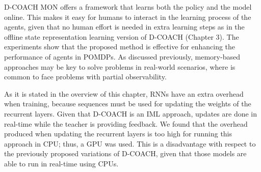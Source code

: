 D-COACH MON offers a framework that learns both the policy and the model online. This makes it easy for humans to interact in the learning process of the agents, given that no human effort is needed in extra learning steps as in the offline state representation learning version of D-COACH (Chapter 3). The experiments show that the proposed method is effective for enhancing the performance of agents in POMDPs. As discussed previously, memory-based approaches may be key to solve problems in real-world scenarios, where is common to face problems with partial observability. 

As it is stated in the overview of this chapter, RNNs have an extra overhead when training, because sequences must be used for updating the weights of the recurrent layers. Given that D-COACH is an IML approach, updates are done in real-time while the teacher is providing feedback. We found that the overhead produced when updating the recurrent layers is too high for running this approach in CPU; thus, a GPU was used. This is a disadvantage with respect to the previously proposed variations of D-COACH, given that those models are able to run in real-time using CPUs. 